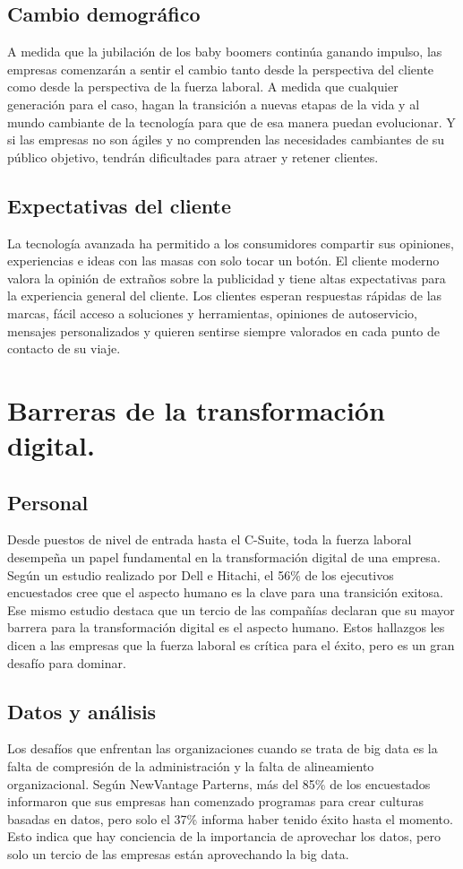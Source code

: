\documentclass[12pt]{article}
\begin{document}
\subsection*{Cambio demográfico}
A medida que la jubilación de los baby boomers continúa ganando impulso, las empresas comenzarán a sentir el cambio tanto desde la perspectiva del cliente como desde la perspectiva de la fuerza laboral. A medida que cualquier generación para el caso, hagan la transición a nuevas etapas de la vida y al mundo cambiante de la tecnología para que de esa manera puedan evolucionar. Y si las empresas no son ágiles y no comprenden las necesidades cambiantes de su público objetivo, tendrán dificultades para atraer y retener clientes.

\subsection*{Expectativas del cliente}
La tecnología avanzada ha permitido a los consumidores compartir sus opiniones, experiencias e ideas con las masas con solo tocar un botón. El cliente moderno valora la opinión de extraños sobre la publicidad y tiene altas expectativas para la experiencia general del cliente. Los clientes esperan respuestas rápidas de las marcas, fácil acceso a soluciones y herramientas, opiniones de autoservicio, mensajes personalizados y quieren sentirse siempre valorados en cada punto de contacto de su viaje.



\section*{Barreras de la transformación digital.}

\subsection*{Personal}
Desde puestos de nivel de entrada hasta el C-Suite, toda la fuerza laboral desempeña un papel fundamental en la transformación digital de una empresa.  Según un estudio realizado por Dell e Hitachi, el 56\% de los ejecutivos encuestados cree que el aspecto humano es la clave para una transición exitosa. Ese mismo estudio destaca que un tercio de las compañías declaran que su mayor barrera para la transformación digital es el aspecto humano. Estos hallazgos les dicen a las empresas que la fuerza laboral es crítica para el éxito, pero es un gran desafío para dominar.

\subsection*{Datos y análisis}
Los desafíos que enfrentan las organizaciones cuando se trata de big data es la falta de compresión de la administración y la falta de alineamiento organizacional. Según NewVantage Parterns, más del 85\% de los encuestados informaron que sus empresas han comenzado programas para crear culturas basadas en datos, pero solo el 37\% informa haber tenido éxito hasta el momento. Esto indica que hay conciencia de la importancia de aprovechar los datos, pero solo un tercio de las empresas están aprovechando la big data.
\end{document}
